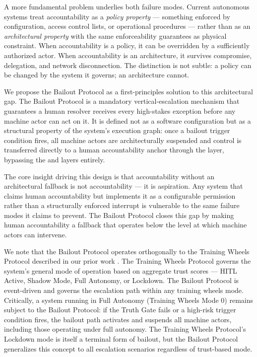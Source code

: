 A more fundamental problem underlies both failure modes. Current autonomous systems treat accountability as a \textit{policy property} — something enforced by configuration, access control lists, or operational procedures — rather than as an \textit{architectural property} with the same enforceability guarantees as physical constraint. When accountability is a policy, it can be overridden by a sufficiently authorized actor. When accountability is an architecture, it survives compromise, delegation, and network disconnection. The distinction is not subtle: a policy can be changed by the system it governs; an architecture cannot.

We propose the Bailout Protocol as a first-principles solution to this architectural gap. The Bailout Protocol is a mandatory vertical-escalation mechanism that guarantees a human resolver receives every high-stakes exception before any machine actor can act on it. It is defined not as a software configuration but as a structural property of the system's execution graph: once a bailout trigger condition fires, all machine actors are architecturally suspended and control is transferred directly to a human accountability anchor through the \fact layer, bypassing the \purpose and \bounds layers entirely.

The core insight driving this design is that accountability without an architectural fallback is not accountability — it is aspiration. Any system that claims human accountability but implements it as a configurable permission rather than a structurally enforced interrupt is vulnerable to the same failure modes it claims to prevent. The Bailout Protocol closes this gap by making human accountability a fallback that operates below the level at which machine actors can intervene.

We note that the Bailout Protocol operates orthogonally to the Training Wheels Protocol described in our prior work \cite{bx3-framework}. The Training Wheels Protocol governs the system's general mode of operation based on aggregate trust scores — HITL Active, Shadow Mode, Full Autonomy, or Lockdown. The Bailout Protocol is event-driven and governs the escalation path within any training wheels mode. Critically, a system running in Full Autonomy (Training Wheels Mode 0) remains subject to the Bailout Protocol: if the Truth Gate fails or a high-risk trigger condition fires, the bailout path activates and suspends all machine actors, including those operating under full autonomy. The Training Wheels Protocol's Lockdown mode is itself a terminal form of bailout, but the Bailout Protocol generalizes this concept to all escalation scenarios regardless of trust-based mode.

